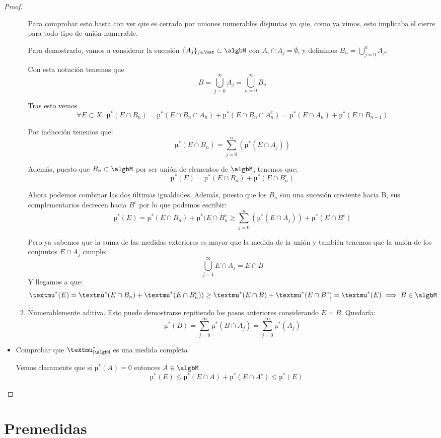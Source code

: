 \documentclass{apuntes}
\begin{document}
\begin{proof}
\begin{itemize}
\begin{enumerate}
Para comprobar esto basta con ver que es cerrada por uniones numerables disjuntas ya que, como ya vimos, esto implicaba el cierre para todo tipo de unión numerable.

Para demostrarlo, vamos a considerar la sucesión $\{A_j\}_{j \in \nat} \subset \algbM$ con $A_i\cap A_j = \emptyset$, y definimos $B_n = \bigcup_{j=0}^{n} A_j$.

Con esta notación tenemos que
\[B= \bigcup_{j=0}^{\infty} A_j = \bigcup_{n=0}^{\infty} B_n\]

Tras esto vemos
\[\forall E \subset X, \ µ^*(E \cap B_n) = µ^*(E \cap B_n \cap A_n)+µ^*(E \cap B_n \cap A_n^c) = µ^*(E \cap A_n)+µ^*(E \cap B_{n-1})\]

Por inducción tenemos que:
\[µ^*(E \cap B_n)= \sum_{j=0}^{n}(µ^*(E \cap A_j))\]

Además, puesto que $B_n \subset \algbM$ por ser unión de elementos de $\algbM$, tenemos que:
\[µ^*(E)=µ^*(E \cap B_n) + µ^*(E \cap B_n^c)\]

Ahora podemos combinar las dos últimas igualdades. Además, puesto que los $B_n$ son una sucesión creciente hacia B, sus complementarios decrecen hacia $B^c$ por lo que podemos escribir:
\[µ^*(E)=µ^*(E \cap B_n) + µ^*(E \cap B_n^c\geq \sum_{j=0}^{n}(µ^*(E \cap A_j)) +µ^*(E \cap B^c)\]

Pero ya sabemos que la suma de las medidas exteriores es mayor que la medida de la unión y también tenemos que la unión de los conjuntos $E \cap A_j$ cumple:
\[\bigcup_{j=1}^{\infty} E \cap A_j = E \cap B\]
Y llegamos a que:
\[µ^*(E)=µ^*(E \cap B_n) + µ^*(E \cap B_n^c)) \geq µ^*(E \cap B) +µ^*(E \cap B^c) = µ^*(E) \implies B \in \algbM\]

\item Numerablemente aditiva.
Esto puede demostrarse repitiendo los pasos anteriores considerando $E=B$.
Quedaría:
\[µ^*(B)=\sum_{j=0}^{\infty}µ^*(B \cap A_j) = \sum_{j=0}^{\infty} µ^*(A_j)\]
\end{enumerate}
\item Comprobar que $µ^*_{|\algbM}$ es una medida completa

Vemos claramente que si $µ^*(A)=0$ entonces $A \in \algbM$
\[µ^*(E) \leq µ^*(E \cap A) + µ^*(E \cap A^c)\leq µ^*(E)\]
\end{itemize}
\end{proof}

\section{Premedidas}
\end{document}
